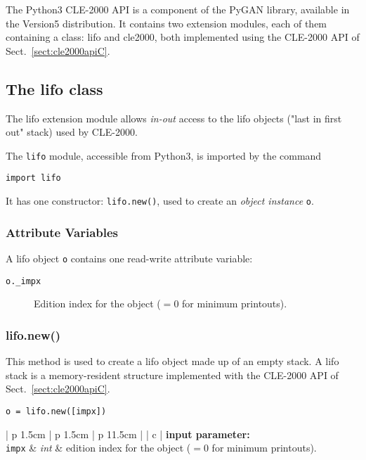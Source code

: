 The Python3 CLE-2000 API is a component of the PyGAN library, available in the Version5 distribution. It contains two extension modules, each of them containing a class: {\sc lifo} and {\sc cle2000}, both implemented using the CLE-2000 API of Sect.~\ref{sect:cle2000apiC}. 

\vskip 0.8cm

\subsection{The lifo class}

The {\sc lifo} extension module allows {\sl in-out} access to the {\sc lifo} objects ("last in first out" stack) used by CLE-2000.

The {\tt lifo} module, accessible from Python3, is imported by the command
\begin{verbatim}
import lifo
\end{verbatim}
It has one constructor: {\tt lifo.new()}, used to create an {\sl object instance} {\tt o}.

\subsubsection{Attribute Variables }

A {\sc lifo} object {\tt o} contains one read-write attribute variable:

\begin {description}
\item [{\tt o.\_impx}] Edition index for the object ($=0$ for minimum printouts).
\end {description}

\subsubsection{lifo.new()}

This method is used to create a {\sc lifo} object made up of an empty stack. A {\sc lifo} stack is a memory-resident structure
implemented with the CLE-2000 API of Sect.~\ref{sect:cle2000apiC}. 

\begin{verbatim}
o = lifo.new([impx])
\end{verbatim}

\noindent
\begin{tabular} {| p {1.5cm} | p {1.5cm} | p {11.5cm} |}
\hline
{} {| c |} {\bf input parameter:} \\
\hline
{\tt impx} & {\it int}  & edition index for the object ($=0$ for minimum printouts). \\
\hline
\end{tabular}

